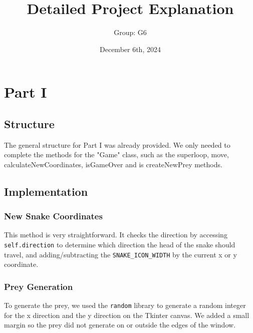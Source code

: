 \documentclass{article}
\title{Detailed Project Explanation}
\author{Group: G6}
\date{December 6th, 2024}
\begin{document}
\maketitle


\section{Part I}



\subsection{Structure}
The general structure for Part I was already provided. We only needed to complete the methods for the "Game" class, such as the superloop, move, calculateNewCoordinates, isGameOver and is createNewPrey methods.

\subsection{Implementation}

\subsubsection{New Snake Coordinates}
This method is very straightforward. It checks the direction by accessing \texttt{self.direction} to determine which direction the head of the snake should travel, and adding/subtracting the \texttt{SNAKE\_ICON\_WIDTH} by the current x or y coordinate.

\subsubsection{Prey Generation}
To generate the prey, we used the \texttt{random} library to generate a random integer for the x direction and the y direction on the Tkinter canvas. We added a small margin so the prey did not generate on or outside the edges of the window.
\end{document}

